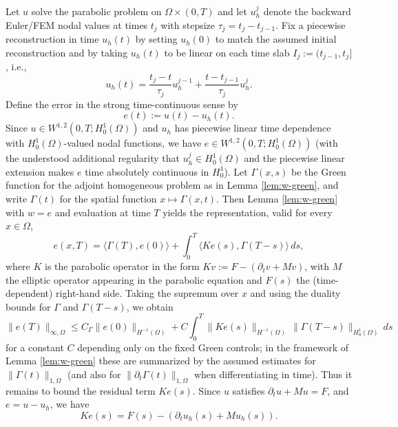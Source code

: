 \documentclass{article}
\begin{document}
Let $u$ solve the parabolic problem on $\Omega\times(0,T)$ and let $u_h^j$ denote the backward Euler/FEM nodal values at times $t_j$ with stepsize $\tau_j=t_j-t_{j-1}$. Fix a piecewise reconstruction in time $u_h(t)$ by setting $u_h(0)$ to match the assumed initial reconstruction and by taking $u_h(t)$ to be linear on each time slab $I_j:=(t_{j-1},t_j]$, i.e.,
\[
u_h(t)=\frac{t_j-t}{\tau_j}u_h^{j-1}+\frac{t-t_{j-1}}{\tau_j}u_h^j.
\]
Define the error in the strong time-continuous sense by
\[
e(t):=u(t)-u_h(t).
\]
Since $u\in W^{1,2}(0,T;H^1_0(\Omega))$ and $u_h$ has piecewise linear time dependence with $H^1_0(\Omega)$-valued nodal functions, we have $e\in W^{1,2}(0,T;H^1_0(\Omega))$ (with the understood additional regularity that $u_h^{j}\in H^1_0(\Omega)$ and the piecewise linear extension makes $e$ time absolutely continuous in $H^1_0$). Let $\Gamma(x,s)$ be the Green function for the adjoint homogeneous problem as in Lemma \ref{lem:w-green}, and write $\Gamma(t)$ for the spatial function $x\mapsto \Gamma(x,t)$. Then Lemma \ref{lem:w-green} with $w=e$ and evaluation at time $T$ yields the representation, valid for every $x\in\Omega$,
\[
e(x,T)=\langle \Gamma(T),e(0)\rangle+\int_0^T\langle K e(s), \Gamma(T-s)\rangle\, ds,
\]
where $K$ is the parabolic operator in the form $K v:=F-(\partial_t v+Mv)$, with $M$ the elliptic operator appearing in the parabolic equation and $F(s)$ the (time-dependent) right-hand side. Taking the supremum over $x$ and using the duality bounds for $\Gamma$ and $\Gamma(T-s)$, we obtain
\[
\|e(T)\|_{\infty,\Omega}\le C_\Gamma\big\|e(0)\big\|_{H^{-1}(\Omega)}+C\int_0^T \big\|K e(s)\big\|_{H^{-1}(\Omega)}\, \|\Gamma(T-s)\|_{H^1_0(\Omega)}\, ds
\]
for a constant $C$ depending only on the fixed Green controls; in the framework of Lemma \ref{lem:w-green} these are summarized by the assumed estimates for $\|\Gamma(t)\|_{1,\Omega}$ (and also for $\|\partial_t\Gamma(t)\|_{1,\Omega}$ when differentiating in time). Thus it remains to bound the residual term $K e(s)$. Since $u$ satisfies $\partial_t u+Mu=F$, and $e=u-u_h$, we have
\[
K e(s)=F(s)-(\partial_t u_h(s)+M u_h(s)).
\]
\end{document}
